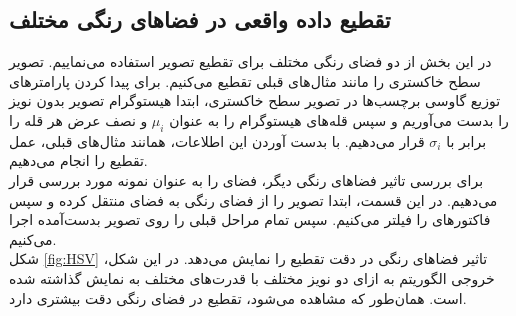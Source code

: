 \documentclass[11.5pt,a4paper]{article}
\begin{document}
\subsection{تقطیع داده واقعی در فضاهای رنگی مختلف}
در این بخش از دو فضای رنگی مختلف برای تقطیع تصویر استفاده می‌نماییم. تصویر سطح خاکستری را مانند مثال‌های قبلی تقطیع می‌کنیم. برای پیدا کردن پارامترهای توزیع گاوسی برچسب‌ها در تصویر سطح خاکستری،‌ ابتدا هیستوگرام تصویر بدون نویز را بدست‌ می‌آوریم و سپس قله‌های هیستوگرام را به عنوان $\mu_i$ و نصف عرض هر قله را برابر با $\sigma_i$ قرار می‌دهیم. با بدست آوردن این اطلاعات، همانند مثال‌های قبلی، عمل تقطیع را انجام می‌دهیم.
\\
برای بررسی تاثیر فضاهای رنگی دیگر، فضای  را به عنوان نمونه مورد بررسی قرار می‌دهیم. در این قسمت، ابتدا تصویر را از فضای رنگی به فضای  منتقل کرده و سپس فاکتورهای  را فیلتر می‌کنیم. سپس تمام مراحل قبلی را روی تصویر بدست‌آمده اجرا می‌کنیم.
\\
شکل 
\ref{fig:HSV}
تاثیر فضاهای رنگی در دقت تقطیع را نمایش می‌دهد. در این شکل، خروجی الگوریتم به ازای دو نویز مختلف با قدرت‌های مختلف به نمایش گذاشته شده است. همان‌طور که مشاهده می‌شود، تقطیع در فضای رنگی  دقت بیشتری دارد.
\end{document}
